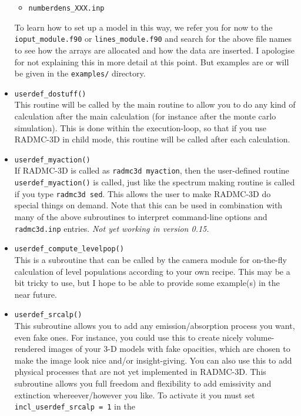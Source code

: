 \documentclass{report}
\begin{document}
\begin{itemize}
\begin{itemize}
    \item {\small\tt numberdens\_XXX.inp}
  \end{itemize}
  To learn how to set up a model in this way, we refer you for now to the
  {\small\tt ioput\_module.f90} or {\small\tt lines\_module.f90} and search
  for the above file names to see how the arrays are allocated and how the
  data are inserted. I apologise for not explaining this in more detail at
  this point. But examples are or will be given in the {\small\tt examples/}
  directory.
\item {\small\tt userdef\_dostuff()}\\
  This routine will be called by the main routine to allow you to do any
  kind of calculation after the main calculation (for instance after the
  monte carlo simulation). This is done within the execution-loop, so that
  if you use RADMC-3D in child mode, this routine will be called after each
  calculation. 
\item {\small\tt userdef\_myaction()}\\
  If RADMC-3D is called as {\small\tt radmc3d myaction}, then the
  user-defined routine {\small\tt userdef\_myaction()} is called, just like
  the spectrum making routine is called if you type {\small\tt radmc3d
    sed}. This allows the user to make RADMC-3D do special things on demand.
  Note that this can be used in combination with many of the above
  subroutines to interpret command-line options and {\small\tt radmc3d.inp}
  entries. {\em Not yet working in version 0.15.}
\item {\small\tt userdef\_compute\_levelpop()}\\
  This is a subroutine that can be called by the camera module for
  on-the-fly calculation of level populations according to your own recipe.
  This may be a bit tricky to use, but I hope to be able to provide some
  example(s) in the near future.  
\item {\small\tt userdef\_srcalp()}\\
  This subroutine allows you to add any emission/absorption process you
  want, even fake ones. For instance, you could use this to create nicely
  volume-rendered images of your 3-D models with fake opacities, which are
  chosen to make the image look nice and/or insight-giving.  You can also
  use this to add physical processes that are not yet implemented in
  RADMC-3D. This subroutine allows you full freedom and flexibility to 
  add emissivity and extinction whereever/however you like. To activate
  it you must set {\small\tt incl\_userdef\_srcalp = 1} in the

\end{itemize}
\end{document}
